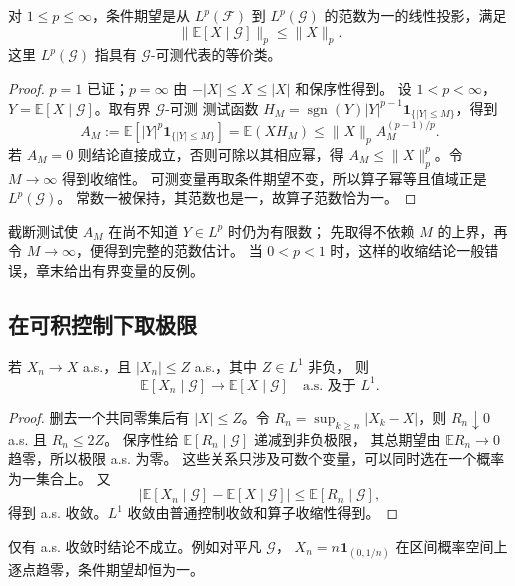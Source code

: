 \begin{theorem}
\label{thm:conditional-lp-contraction}
对 $1\le p\le\infty$，条件期望是从 $L^p(\mathcal F)$ 到
$L^p(\mathcal G)$ 的范数为一的线性投影，满足
\[
 \|\mathbb E[X\mid\mathcal G]\|_p\le\|X\|_p.
\]
这里 $L^p(\mathcal G)$ 指具有 $\mathcal G$-可测代表的等价类。
\end{theorem}

\begin{proof}
$p=1$ 已证；$p=\infty$ 由 $-|X|\le X\le|X|$ 和保序性得到。
设 $1<p<\infty$，$Y=\mathbb E[X\mid\mathcal G]$。取有界 $\mathcal G$-可测
测试函数
$H_M=\operatorname{sgn}(Y)|Y|^{p-1}\mathbf1_{\{|Y|\le M\}}$，得到
\[
 A_M:=\mathbb E[|Y|^p\mathbf1_{\{|Y|\le M\}}]
 =\mathbb E(XH_M)
 \le\|X\|_p A_M^{(p-1)/p}.
\]
若 $A_M=0$ 则结论直接成立，否则可除以其相应幂，得
$A_M\le\|X\|_p^p$。令 $M\to\infty$ 得到收缩性。
可测变量再取条件期望不变，所以算子幂等且值域正是 $L^p(\mathcal G)$。
常数一被保持，其范数也是一，故算子范数恰为一。
\end{proof}

截断测试使 $A_M$ 在尚不知道 $Y\in L^p$ 时仍为有限数；
先取得不依赖 $M$ 的上界，再令 $M\to\infty$，便得到完整的范数估计。
当 $0<p<1$ 时，这样的收缩结论一般错误，章末给出有界变量的反例。

\subsection{在可积控制下取极限}

\begin{theorem}[条件控制收敛]
\label{thm:conditional-dominated-convergence}
若 $X_n\to X$ a.s.，且 $|X_n|\le Z$ a.s.，其中 $Z\in L^1$ 非负，
则
\[
 \mathbb E[X_n\mid\mathcal G]\longrightarrow\mathbb E[X\mid\mathcal G]
 \quad\text{a.s. 及于 }L^1.
\]
\end{theorem}

\begin{proof}
删去一个共同零集后有 $|X|\le Z$。令
$R_n=\sup_{k\ge n}|X_k-X|$，则 $R_n\downarrow0$ a.s. 且 $R_n\le2Z$。
保序性给 $\mathbb E[R_n\mid\mathcal G]$ 递减到非负极限，
其总期望由 $\mathbb E R_n\to0$ 趋零，所以极限 a.s. 为零。
这些关系只涉及可数个变量，可以同时选在一个概率为一集合上。
又
\[
 |\mathbb E[X_n\mid\mathcal G]-\mathbb E[X\mid\mathcal G]|
 \le\mathbb E[R_n\mid\mathcal G],
\]
得到 a.s. 收敛。$L^1$ 收敛由普通控制收敛和算子收缩性得到。
\end{proof}

仅有 a.s. 收敛时结论不成立。例如对平凡 $\mathcal G$，
$X_n=n\mathbf1_{(0,1/n)}$ 在区间概率空间上逐点趋零，条件期望却恒为一。

